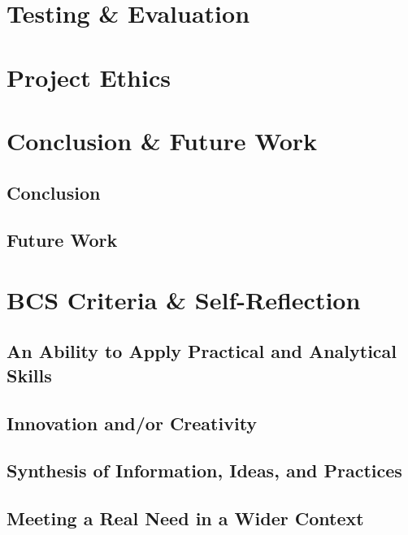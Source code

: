 \documentclass[12pt]{article}
\begin{document}
\section{Testing \& Evaluation}

\section{Project Ethics}

\section{Conclusion \& Future Work}
\subsection{Conclusion}

\subsection{Future Work}

\section{BCS Criteria \& Self-Reflection}

\subsection{An Ability to Apply Practical and Analytical Skills}

\subsection{Innovation and/or Creativity}

\subsection{Synthesis of Information, Ideas, and Practices}

\subsection{Meeting a Real Need in a Wider Context}
\end{document}
